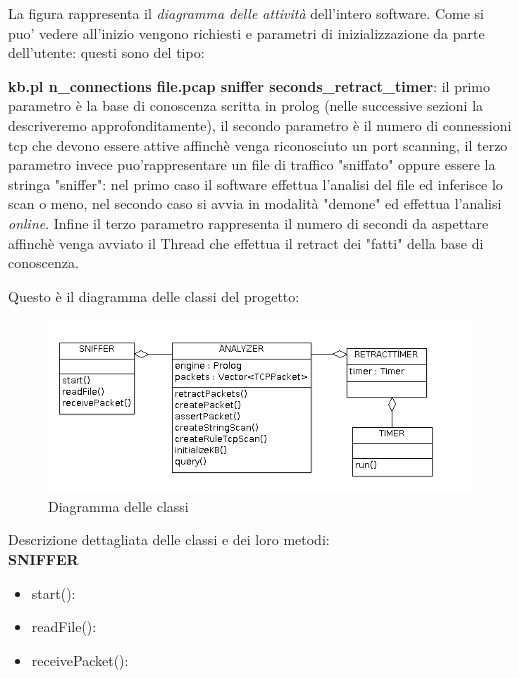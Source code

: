 \documentclass[a4paper,12pt]{article} %
\begin{document}
La figura rappresenta il \emph{diagramma delle attività} dell'intero software. Come si puo' vedere
all'inizio vengono richiesti e parametri di inizializzazione da parte dell'utente: questi sono del tipo: 



\textbf{kb.pl n\_connections file.pcap sniffer seconds\_retract\_timer}: il primo parametro è la base di conoscenza
scritta in prolog (nelle successive sezioni la descriveremo approfonditamente), il secondo parametro è il numero di connessioni
tcp che devono essere attive affinchè venga riconosciuto un port scanning, il terzo parametro invece puo'rappresentare un 
file di traffico "sniffato" oppure essere la stringa "sniffer": nel primo caso il software effettua l'analisi del file ed inferisce
lo scan o meno, nel secondo caso si avvia in modalità "demone" ed effettua l'analisi \emph{online}. Infine il terzo parametro
rappresenta il numero di secondi da aspettare affinchè venga avviato il Thread che effettua il retract dei "fatti" della base di 
conoscenza.





Questo è il diagramma delle classi del progetto:



\begin{figure}[htbp]
\centering
\includegraphics[width=15cm]{classi.png}
\caption{\label{Diagramma delle classi} Diagramma delle classi}
\end{figure}


Descrizione dettagliata delle classi e dei loro metodi:\\


\textbf{SNIFFER}

\begin{itemize}

\item start():
\item readFile():
\item receivePacket():

\end{itemize}
\end{document}
